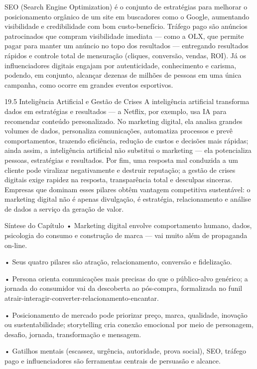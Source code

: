 SEO (Search Engine Optimization) é o conjunto de estratégias para melhorar o posicionamento orgânico de um site em buscadores como o Google, aumentando visibilidade e credibilidade com bom custo-benefício. Tráfego pago são anúncios patrocinados que compram visibilidade imediata — como a OLX, que permite pagar para manter um anúncio no topo dos resultados — entregando resultados rápidos e controle total de mensuração (cliques, conversão, vendas, ROI). Já os influenciadores digitais engajam por autenticidade, conhecimento e carisma, podendo, em conjunto, alcançar dezenas de milhões de pessoas em uma única campanha, como ocorre em grandes eventos esportivos.

19.5 Inteligência Artificial e Gestão de Crises A inteligência artificial transforma dados em estratégias e resultados — a Netflix, por exemplo, usa IA para recomendar conteúdo personalizado. No marketing digital, ela analisa grandes volumes de dados, personaliza comunicações, automatiza processos e prevê comportamentos, trazendo eficiência, redução de custos e decisões mais rápidas; ainda assim, a inteligência artificial não substitui o marketing — ela potencializa pessoas, estratégias e resultados. Por fim, uma resposta mal conduzida a um cliente pode viralizar negativamente e destruir reputação; a gestão de crises digitais exige rapidez na resposta, transparência total e desculpas sinceras. Empresas que dominam esses pilares obtêm vantagem competitiva sustentável: o marketing digital não é apenas divulgação, é estratégia, relacionamento e análise de dados a serviço da geração de valor.

Síntese do Capítulo • Marketing digital envolve comportamento humano, dados, psicologia do consumo e construção de marca — vai muito além de propaganda on-line.

• Seus quatro pilares são atração, relacionamento, conversão e fidelização.

• Persona orienta comunicações mais precisas do que o público-alvo genérico; a jornada do consumidor vai da descoberta ao pós-compra, formalizada no funil atrair-interagir-converter-relacionamento-encantar.

• Posicionamento de mercado pode priorizar preço, marca, qualidade, inovação ou sustentabilidade; storytelling cria conexão emocional por meio de personagem, desafio, jornada, transformação e mensagem.

• Gatilhos mentais (escassez, urgência, autoridade, prova social), SEO, tráfego pago e influenciadores são ferramentas centrais de persuasão e alcance.


